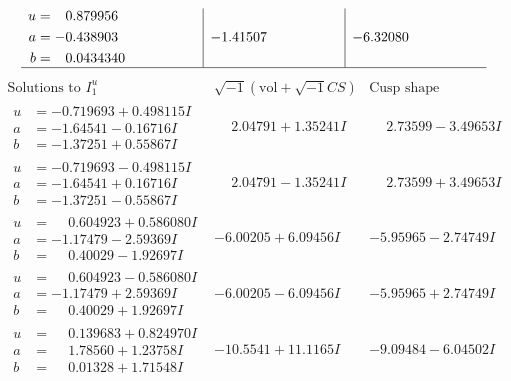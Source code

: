 \documentclass[1p]{elsarticle_modified}
\theoremstyle{definition}
\newcommand{\I}{\sqrt{-1}}
\begin{document}
$$\begin{array}{c|c|c}
\begin{aligned}
u &= \phantom{-}0.879956\phantom{ +0.000000I} \\
a &= -0.438903\phantom{ +0.000000I} \\
b &= \phantom{-}0.0434340\phantom{ +0.000000I}\end{aligned}
 & -1.41507\phantom{ +0.000000I} & -6.32080\phantom{ +0.000000I}\\
 \hline 
 \end{array}$$\newpage$$\begin{array}{c|c|c}  
\text{Solutions to }I^u_{1}& \I (\text{vol} + \sqrt{-1}CS) & \text{Cusp shape}\\
 \hline 
\begin{aligned}
u &= -0.719693 + 0.498115 I \\
a &= -1.64541 - 0.16716 I \\
b &= -1.37251 + 0.55867 I\end{aligned}
 & \phantom{-}2.04791 + 1.35241 I & \phantom{-}2.73599 - 3.49653 I \\ \hline\begin{aligned}
u &= -0.719693 - 0.498115 I \\
a &= -1.64541 + 0.16716 I \\
b &= -1.37251 - 0.55867 I\end{aligned}
 & \phantom{-}2.04791 - 1.35241 I & \phantom{-}2.73599 + 3.49653 I \\ \hline\begin{aligned}
u &= \phantom{-}0.604923 + 0.586080 I \\
a &= -1.17479 - 2.59369 I \\
b &= \phantom{-}0.40029 - 1.92697 I\end{aligned}
 & -6.00205 + 6.09456 I & -5.95965 - 2.74749 I \\ \hline\begin{aligned}
u &= \phantom{-}0.604923 - 0.586080 I \\
a &= -1.17479 + 2.59369 I \\
b &= \phantom{-}0.40029 + 1.92697 I\end{aligned}
 & -6.00205 - 6.09456 I & -5.95965 + 2.74749 I \\ \hline\begin{aligned}
u &= \phantom{-}0.139683 + 0.824970 I \\
a &= \phantom{-}1.78560 + 1.23758 I \\
b &= \phantom{-}0.01328 + 1.71548 I\end{aligned}
 & -10.5541 + 11.1165 I & -9.09484 - 6.04502 I \\ \hline\begin{aligned}

\end{aligned}
\end{array}$$
\end{document}
